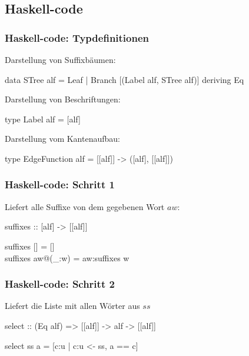 \documentclass{beamer}
\begin{document}

\subsection{Haskell-code}


\begin{frame}[t]
\frametitle{Haskell-code: Typdefinitionen}

    Darstellung von Suffixbäumen:

    \medskip

    data STree alf = Leaf | Branch [(Label alf, STree alf)] deriving Eq

    \bigskip

    Darstellung von Beschriftungen:

    \medskip

    type Label alf = [alf]

    \bigskip

    Darstellung vom Kantenaufbau:

    \medskip

    type EdgeFunction alf = [[alf]] -> ([alf], [[alf]])

\end{frame}


\begin{frame}[t]
\frametitle{Haskell-code: Schritt 1}

Liefert alle Suffixe von dem gegebenen Wort $aw$:

\bigskip

suffixes :: [alf] -> [[alf]]

\bigskip

suffixes []       = []              \\
suffixes aw@(\_:w) = aw:suffixes w  \\

\end{frame}


\begin{frame}[t]
\frametitle{Haskell-code: Schritt 2}

    Liefert die Liste mit allen Wörter aus $ss$ 

    \bigskip

    select :: (Eq alf) => [[alf]] -> alf -> [[alf]] 

    \bigskip
    
    select ss a = [c:u | c:u <- ss, a == c]         

\end{frame}
\end{document}
